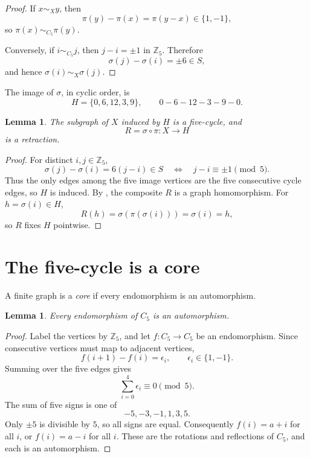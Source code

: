 \documentclass[10pt,reqno]{amsart}
\newtheorem{lemma}[theorem]{Lemma}
\theoremstyle{definition}
\begin{document}
\begin{proof}
If \(x\sim_X y\), then
\[
 \pi(y)-\pi(x)=\pi(y-x)\in\{1,-1\},
\]
so \(\pi(x)\sim_{C_5}\pi(y)\).

Conversely, if \(i\sim_{C_5}j\), then \(j-i=\pm1\) in \(\mathbb Z_5\).
Therefore
\[
 \sigma(j)-\sigma(i)=\pm6\in S,
\]
and hence \(\sigma(i)\sim_X\sigma(j)\).
\end{proof}

The image of \(\sigma\), in cyclic order, is
\[
 H=\{0,6,12,3,9\},\qquad 0-6-12-3-9-0.
\]

\begin{lemma}\label{lem:induced}
The subgraph of \(X\) induced by \(H\) is a five-cycle, and
\[
 R=\sigma\circ\pi:X\longrightarrow H
\]
is a retraction.
\end{lemma}

\begin{proof}
For distinct \(i,j\in\mathbb Z_5\),
\[
 \sigma(j)-\sigma(i)=6(j-i)\in S
 \quad\Longleftrightarrow\quad
 j-i\equiv\pm1\pmod5.
\]
Thus the only edges among the five image vertices are the five consecutive
cycle edges, so \(H\) is induced.  By , the composite \(R\)
is a graph homomorphism.  For \(h=\sigma(i)\in H\),
\[
 R(h)=\sigma(\pi(\sigma(i)))=\sigma(i)=h,
\]
so \(R\) fixes \(H\) pointwise.
\end{proof}

\section{The five-cycle is a core}

A finite graph is a \emph{core} if every endomorphism is an automorphism.

\begin{lemma}\label{lem:c5core}
Every endomorphism of \(C_5\) is an automorphism.
\end{lemma}

\begin{proof}
Label the vertices by \(\mathbb Z_5\), and let
\(f:C_5\to C_5\) be an endomorphism.  Since consecutive vertices must map
to adjacent vertices,
\[
 f(i+1)-f(i)=\epsilon_i,\qquad
 \epsilon_i\in\{1,-1\}.
\]
Summing over the five edges gives
\[
 \sum_{i=0}^{4}\epsilon_i\equiv0\pmod5.
\]
The sum of five signs is one of
\[
 -5,-3,-1,1,3,5.
\]
Only \(\pm5\) is divisible by \(5\), so all signs are equal.  Consequently
\(f(i)=a+i\) for all \(i\), or \(f(i)=a-i\) for all \(i\).  These are the
rotations and reflections of \(C_5\), and each is an automorphism.
\end{proof}
\end{document}
